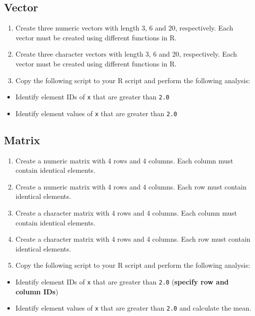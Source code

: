 \documentclass[
]{book}
\providecommand{\tightlist}{%
  \setlength{\itemsep}{0pt}\setlength{\parskip}{0pt}}
\begin{document}
\hypertarget{vector-1}{%
\subsection{Vector}\label{vector-1}}

\begin{enumerate}
\def\labelenumi{\alph{enumi}.}
\tightlist
\item
  Create three numeric vectors with length 3, 6 and 20, respectively. Each vector must be created using different functions in R.
\item
  Create three character vectors with length 3, 6 and 20, respectively. Each vector must be created using different functions in R.
\item
  Copy the following script to your R script and perform the following analysis:
\end{enumerate}

\begin{itemize}
\tightlist
\item
  Identify element IDs of \texttt{x} that are greater than \texttt{2.0}
\item
  Identify element values of \texttt{x} that are greater than \texttt{2.0}
\end{itemize}

\hypertarget{matrix-1}{%
\subsection{Matrix}\label{matrix-1}}

\begin{enumerate}
\def\labelenumi{\alph{enumi}.}
\tightlist
\item
  Create a numeric matrix with 4 rows and 4 columns. Each column must contain identical elements.
\item
  Create a numeric matrix with 4 rows and 4 columns. Each row must contain identical elements.
\item
  Create a character matrix with 4 rows and 4 columns. Each column must contain identical elements.
\item
  Create a character matrix with 4 rows and 4 columns. Each row must contain identical elements.
\item
  Copy the following script to your R script and perform the following analysis:
\end{enumerate}

\begin{itemize}
\tightlist
\item
  Identify element IDs of \texttt{x} that are greater than \texttt{2.0} (\textbf{specify row and column IDs})
\item
  Identify element values of \texttt{x} that are greater than \texttt{2.0} and calculate the mean.
\end{itemize}
\end{document}
